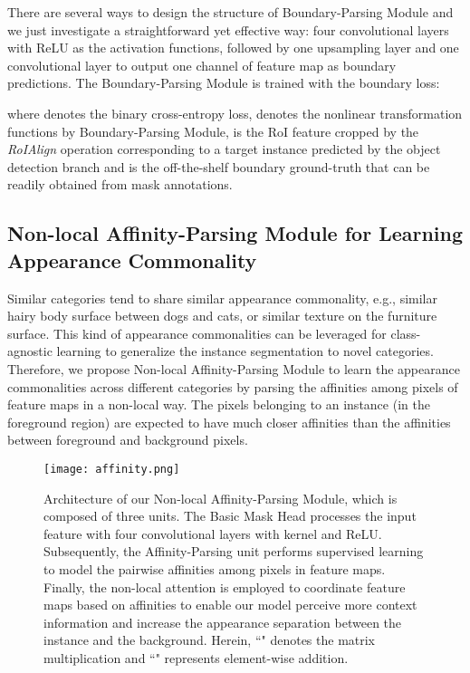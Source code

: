 \documentclass[runningheads]{llncs}
\begin{document}
There are several ways to design the structure of Boundary-Parsing Module and we just investigate a straightforward yet effective way: four  convolutional layers with ReLU as the activation functions, followed by one upsampling layer and one  convolutional layer to output one channel of feature map as boundary predictions. The Boundary-Parsing Module is trained with the boundary loss:

\vspace{-0.1in}
\begin{small}

\end{small}

\vspace{-2mm}\noindent
where  denotes the binary cross-entropy loss,  denotes the nonlinear transformation functions by Boundary-Parsing Module,  is the RoI feature cropped by the \emph{RoIAlign} operation corresponding to a target instance predicted by the object detection branch and  is the off-the-shelf boundary ground-truth that can be readily obtained from mask annotations.

\vspace{-0.1in}
\subsection{Non-local Affinity-Parsing Module for Learning Appearance Commonality}
\label{sec:affinity}
Similar categories tend to share similar appearance commonality, e.g., similar hairy body surface between dogs and cats, or similar texture on the furniture surface.
This kind of appearance commonalities can be leveraged for class-agnostic learning to generalize the instance segmentation to novel categories. Therefore, we propose Non-local Affinity-Parsing Module to learn the appearance commonalities across different categories by parsing the affinities among pixels of feature maps in a non-local way. The pixels belonging to an instance (in the foreground region) are expected to have much closer affinities than the affinities between foreground and background pixels.

\begin{figure}[t]
\centering
\texttt{[image: affinity.png]}
\vspace{-0.15in}
\caption{Architecture of our Non-local Affinity-Parsing Module, which is composed of three units. The Basic Mask Head processes the input feature with four convolutional layers with  kernel and ReLU. Subsequently, the Affinity-Parsing unit performs supervised learning to model the pairwise affinities among pixels in feature maps. Finally, the non-local attention is employed to coordinate feature maps based on affinities to enable our model perceive more context information and increase the appearance separation between the instance and the background. Herein, ``" denotes the matrix multiplication and ``" represents element-wise addition.}
\label{fig:affinity}
\vspace{-0.25in}
\end{figure}
\end{document}
